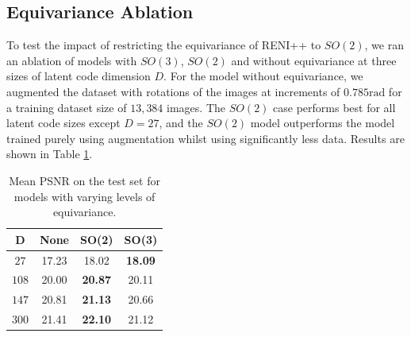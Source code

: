 \subsection{Equivariance Ablation}
\label{AblationEquivariance}
To test the impact of restricting the equivariance of RENI++ to $SO(2)$, we ran an ablation of models with $SO(3)$, $SO(2)$ and without equivariance at three sizes of latent code dimension $D$. For the model without equivariance, we augmented the dataset with rotations of the images at increments of $0.785 \text{rad}$ for a training dataset size of $13,384$ images. The $SO(2)$ case performs best for all latent code sizes except $D = 27$, and the $SO(2)$ model outperforms the model trained purely using augmentation whilst using significantly less data. Results are shown in Table \ref{tab:comparison_equivariance}.

\begin{table}\centering
\begin{tabular}{@{}c ccc@{}}\toprule
D & None & SO(2) & SO(3)   \\
\midrule
$27$  & 17.23 & 18.02 & \textbf{18.09} \\
$108$ & 20.00 & \textbf{20.87} & 20.11 \\
$147$ & 20.81 & \textbf{21.13} & 20.66 \\
$300$ & 21.41 & \textbf{22.10} & 21.12 \\
\bottomrule
\end{tabular}
\caption{Mean PSNR on the test set for models with varying levels of equivariance.}
\label{tab:comparison_equivariance}
\end{table}
